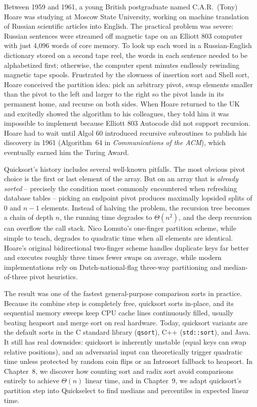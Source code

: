 \begin{historybox}
Between 1959 and 1961, a young British postgraduate named C.A.R.\ (Tony) Hoare was studying at
Moscow State University, working on machine translation of Russian scientific articles into English.
The practical problem was severe: Russian sentences were streamed off magnetic tape on an
Elliott 803 computer with just 4,096 words of core memory. To look up each word in a Russian-English
dictionary stored on a second tape reel, the words in each sentence needed to be alphabetized first;
otherwise, the computer spent minutes endlessly rewinding magnetic tape spools. Frustrated by the
slowness of insertion sort and Shell sort, Hoare conceived the partition idea: pick an arbitrary
pivot, swap elements smaller than the pivot to the left and larger to the right so the pivot lands
in its permanent home, and recurse on both sides. When Hoare returned to the UK and excitedly showed
the algorithm to his colleagues, they told him it was impossible to implement because Elliott 803
Autocode did not support recursion. Hoare had to wait until Algol 60 introduced recursive
subroutines to publish his discovery in 1961 (Algorithm~64 in \emph{Communications of the ACM}), which
eventually earned him the Turing Award.

Quicksort's history includes several well-known pitfalls. The most obvious pivot choice is the first
or last element of the array. But on an array that is \emph{already sorted} -- precisely the
condition most commonly encountered when refreshing database tables -- picking an endpoint pivot
produces maximally lopsided splits of $0$ and $n-1$ elements. Instead of halving the problem, the
recursion tree becomes a chain of depth $n$, the running time degrades to $\Theta(n^2)$, and the
deep recursion can overflow the call stack.
Nico Lomuto's one-finger partition scheme, while simple to teach, degrades to
quadratic time when all elements are identical. Hoare's original bidirectional two-finger scheme
handles duplicate keys far better and executes roughly three times fewer swaps on average, while
modern implementations rely on Dutch-national-flag three-way partitioning and median-of-three pivot
heuristics.

The result was one of the fastest general-purpose comparison sorts in practice.
Because its combine step is completely free, quicksort sorts in-place, and its sequential memory
sweeps keep CPU cache lines continuously filled, usually beating heapsort and merge sort on real
hardware. Today, quicksort variants are the default sorts in the C standard library
(\lstinline|qsort|), C++ (\lstinline|std::sort|), and Java. It still has real downsides:
quicksort is inherently unstable (equal keys can swap relative positions), and an adversarial input
can theoretically trigger quadratic time unless protected by random coin flips or an Introsort
fallback to heapsort. In Chapter~8, we discover how counting sort and radix sort avoid
comparisons entirely to achieve $\Theta(n)$ linear time, and in Chapter~9, we adapt
quicksort's partition step into Quickselect to find medians and percentiles in expected linear time.
\end{historybox}

